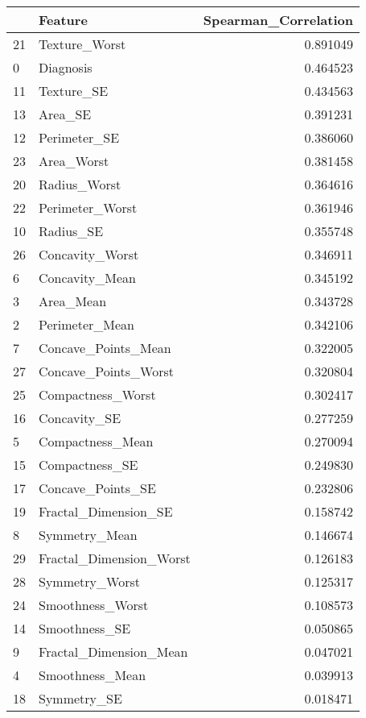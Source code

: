 \begin{tabular}{llr}
\toprule
 & Feature & Spearman_Correlation \\
\midrule
21 & Texture_Worst & 0.891049 \\
0 & Diagnosis & 0.464523 \\
11 & Texture_SE & 0.434563 \\
13 & Area_SE & 0.391231 \\
12 & Perimeter_SE & 0.386060 \\
23 & Area_Worst & 0.381458 \\
20 & Radius_Worst & 0.364616 \\
22 & Perimeter_Worst & 0.361946 \\
10 & Radius_SE & 0.355748 \\
26 & Concavity_Worst & 0.346911 \\
6 & Concavity_Mean & 0.345192 \\
3 & Area_Mean & 0.343728 \\
2 & Perimeter_Mean & 0.342106 \\
7 & Concave_Points_Mean & 0.322005 \\
27 & Concave_Points_Worst & 0.320804 \\
25 & Compactness_Worst & 0.302417 \\
16 & Concavity_SE & 0.277259 \\
5 & Compactness_Mean & 0.270094 \\
15 & Compactness_SE & 0.249830 \\
17 & Concave_Points_SE & 0.232806 \\
19 & Fractal_Dimension_SE & 0.158742 \\
8 & Symmetry_Mean & 0.146674 \\
29 & Fractal_Dimension_Worst & 0.126183 \\
28 & Symmetry_Worst & 0.125317 \\
24 & Smoothness_Worst & 0.108573 \\
14 & Smoothness_SE & 0.050865 \\
9 & Fractal_Dimension_Mean & 0.047021 \\
4 & Smoothness_Mean & 0.039913 \\
18 & Symmetry_SE & 0.018471 \\
\bottomrule
\end{tabular}

